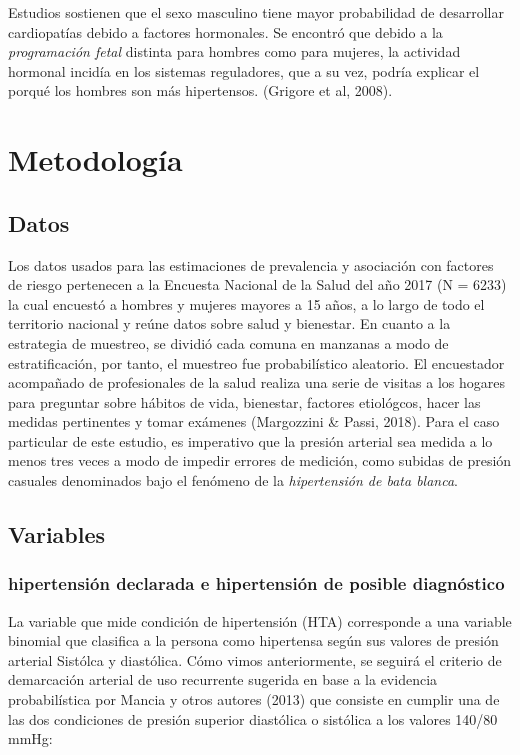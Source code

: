 \documentclass{aa}
\begin{document}
Estudios sostienen que el sexo masculino tiene mayor probabilidad de desarrollar cardiopatías debido a factores hormonales. Se encontró que debido a la \textit{programación fetal} distinta para hombres como para mujeres, la actividad hormonal incidía en los sistemas reguladores, que a su vez, podría explicar el porqué los hombres son más hipertensos. (Grigore et al, 2008).

\section{Metodología}

\subsection{Datos}

Los datos usados para las estimaciones de prevalencia y asociación con factores de riesgo pertenecen a la Encuesta Nacional de la Salud del año 2017 (N = 6233) la cual encuestó a hombres y mujeres mayores a 15 años, a lo largo de todo el territorio nacional y reúne datos sobre salud y bienestar. En cuanto a la estrategia de muestreo, se dividió cada comuna en manzanas a modo de estratificación, por tanto, el muestreo fue probabilístico aleatorio. 
El encuestador acompañado de profesionales de la salud realiza una serie de visitas a los hogares para preguntar sobre hábitos de vida, bienestar, factores etiológcos, hacer las medidas pertinentes y tomar exámenes (Margozzini \& Passi, 2018). Para el caso particular de este estudio, es imperativo que la presión arterial sea medida a lo menos tres veces a modo de impedir errores de medición, como subidas de presión casuales denominados bajo el fenómeno de la \textit{hipertensión de bata blanca}.

 \subsection{Variables}

\subsubsection{hipertensión declarada e hipertensión de posible diagnóstico}

La variable que mide condición de hipertensión (HTA) corresponde a una variable binomial que clasifica a la persona como hipertensa según sus valores de presión arterial Sistólca y diastólica. Cómo vimos anteriormente, se seguirá el criterio de demarcación arterial de uso recurrente sugerida en base a la evidencia probabilística por Mancia y otros autores (2013) que consiste en cumplir una de las dos condiciones de presión superior diastólica o sistólica a los valores 140/80 mmHg:
\end{document}
